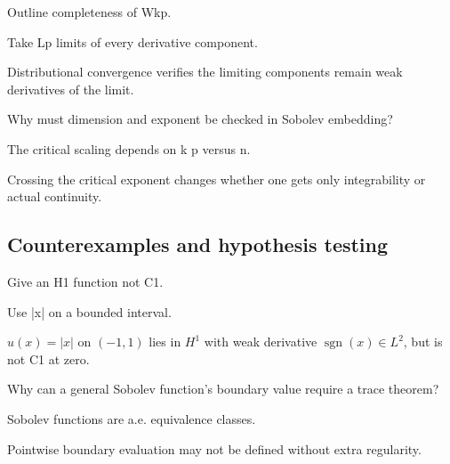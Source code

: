 \begin{exercise}\label{exr:iii21-expand-08}
Outline completeness of Wkp.
\end{exercise}
\begin{hint}
Take Lp limits of every derivative component.
\end{hint}
\begin{solution}
Distributional convergence verifies the limiting components remain weak derivatives of the limit.
\end{solution}

\begin{exercise}\label{exr:iii21-expand-09}
Why must dimension and exponent be checked in Sobolev embedding?
\end{exercise}
\begin{hint}
The critical scaling depends on k p versus n.
\end{hint}
\begin{solution}
Crossing the critical exponent changes whether one gets only integrability or actual continuity.
\end{solution}

\subsection*{Counterexamples and hypothesis testing}

\begin{exercise}\label{exr:iii21-expand-10}
Give an H1 function not C1.
\end{exercise}
\begin{hint}
Use |x| on a bounded interval.
\end{hint}
\begin{solution}
$u(x)=|x|$ on $(-1,1)$ lies in $H^1$ with weak derivative $\operatorname{sgn}(x)\in L^2$, but is not C1 at zero.
\end{solution}

\begin{exercise}\label{exr:iii21-expand-11}
Why can a general Sobolev function's boundary value require a trace theorem?
\end{exercise}
\begin{hint}
Sobolev functions are a.e. equivalence classes.
\end{hint}
\begin{solution}
Pointwise boundary evaluation may not be defined without extra regularity.
\end{solution}

